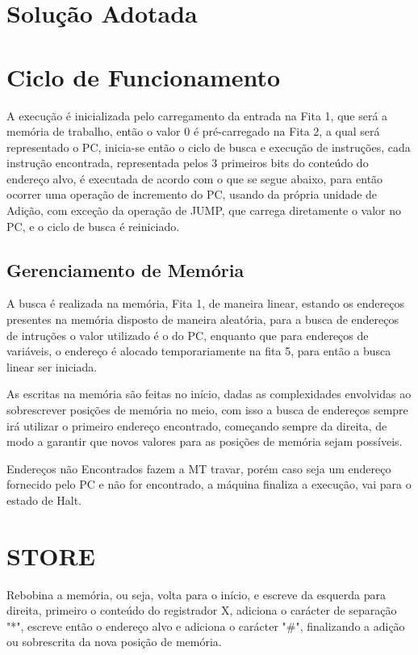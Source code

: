 \documentclass[a4paper,12pt]{article}
\begin{document}
\section{Solução Adotada}

\section*{Ciclo de Funcionamento}
A execução é inicializada pelo carregamento da entrada na Fita 1, que será a memória de trabalho, então o valor $0$ é pré-carregado na Fita 2, a qual será representado o PC, inicia-se então o ciclo de busca e execução de instruções, cada instrução encontrada, representada pelos 3 primeiros bits do conteúdo do endereço alvo, é executada de acordo com o que se segue abaixo, para então ocorrer uma operação de incremento do PC, usando da própria unidade de Adição, com exceção da operação de JUMP, que carrega diretamente o valor no PC, e o ciclo de busca é reiniciado.

\subsection*{Gerenciamento de Memória}
A busca é realizada na memória, Fita 1, de maneira linear, estando os endereços presentes na memória disposto de maneira aleatória, para a busca de endereços de intruções o valor utilizado é o do PC, enquanto que para endereços de variáveis, o endereço é alocado temporariamente na fita 5, para então a busca linear ser iniciada.

As escritas na memória são feitas no início, dadas as complexidades envolvidas ao sobrescrever posições de memória no meio, com isso a busca de endereços sempre irá utilizar o primeiro endereço encontrado, começando sempre da direita, de modo a garantir que novos valores para as posições de memória sejam possíveis.

Endereços não Encontrados fazem a MT travar, porém caso seja um endereço fornecido pelo PC e não for encontrado, a máquina finaliza a execução, vai para o estado de Halt.

\section*{STORE}
Rebobina a memória, ou seja, volta para o início, e escreve da esquerda para direita, primeiro o conteúdo do registrador X, adiciona o carácter de separação "*", escreve então o endereço alvo e adiciona o carácter "\#", finalizando a adição ou sobrescrita da nova posição de memória.
\end{document}
